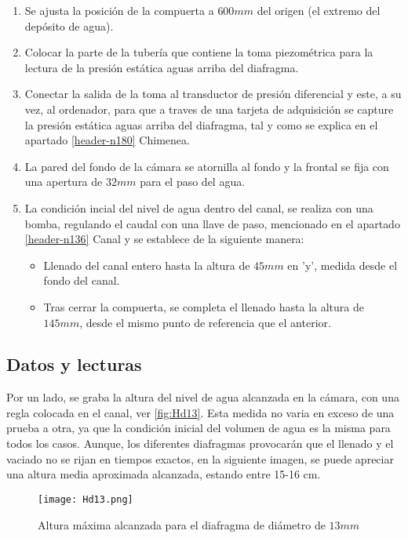 \begin{enumerate}
\def\labelenumi{\arabic{enumi}.}
\item
  Se ajusta la posición de la compuerta a \(600mm\) del origen (el
  extremo del depósito de agua).
\item
  Colocar la parte de la tubería que contiene la toma piezométrica para
  la lectura de la presión estática aguas arriba del diafragma.
\item
  Conectar la salida de la toma al transductor de presión diferencial y
  este, a su vez, al ordenador, para que a traves de una tarjeta de
  adquisición se capture la presión estática aguas arriba del diafragma,
  tal y como se explica en el apartado \ref{header-n180} Chimenea.
\item
  La pared del fondo de la cámara se atornilla al fondo y la frontal se
  fija con una apertura de \(32mm\) para el paso del agua.
\item
  La condición incial del nivel de agua dentro del canal, se realiza con
  una bomba, regulando el caudal con una llave de paso, mencionado en el
  apartado \ref{header-n136} Canal y se establece de la siguiente manera:

  \begin{itemize}
  \item
    Llenado del canal entero hasta la altura de \(45mm\) en 'y', medida
    desde el fondo del canal.
  \item
    Tras cerrar la compuerta, se completa el llenado hasta la altura de
    \(145mm\), desde el mismo punto de referencia que el anterior.
  \end{itemize}
\end{enumerate}

\subsection{Datos y lecturas}\label{header-n544}

Por un lado, se graba la altura del nivel de agua alcanzada en la
cámara, con una regla colocada en el canal, ver \autoref{fig:Hd13}. Esta medida no varia en
exceso de una prueba a otra, ya que la condición inicial del volumen de
agua es la misma para todos los casos. Aunque, los diferentes diafragmas
provocarán que el llenado y el vaciado no se rijan en tiempos exactos,
en la siguiente imagen, se puede apreciar una altura media aproximada
alcanzada, estando entre 15-16 cm.

\begin{figure}[hb]
\centering
\texttt{[image: Hd13.png]}
\caption{Altura máxima alcanzada para el diafragma de diámetro de $13mm$}
\label{fig:Hd13}
\end{figure}

